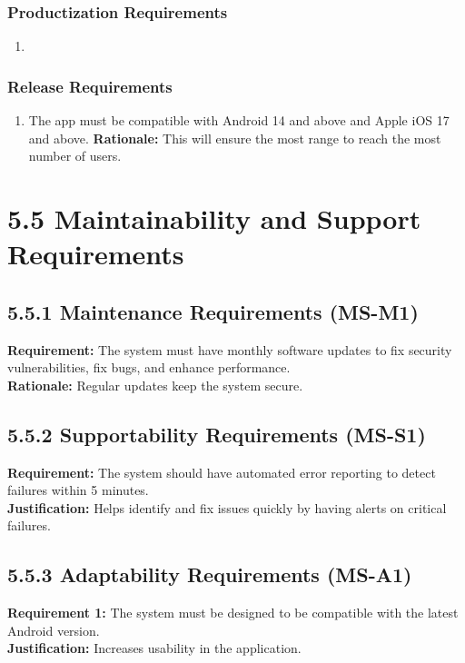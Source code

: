\documentclass[]{article}
\begin{document}
\subsubsection{Productization Requirements}
\label{ssub:productization_requirements}
\begin{enumerate}[{OE-P}1. ]
	\item 
\end{enumerate}

\subsubsection{Release Requirements}
\label{ssub:release_requirements}
\begin{enumerate}[{OE-R}1. ]
	\item The app must be compatible with Android 14 and above and Apple iOS 17 and above.
	 \textbf{ Rationale: } This will ensure the most range to reach the most number of users. 
\end{enumerate}


\section*{5.5 Maintainability and Support Requirements}

\subsection*{5.5.1 Maintenance Requirements (MS-M1)}
\textbf{Requirement:} The system must have monthly software updates to fix security vulnerabilities, fix bugs, and enhance performance.\\
\textbf{Rationale:} Regular updates keep the system secure.

\subsection*{5.5.2 Supportability Requirements (MS-S1)}
\textbf{Requirement:} The system should have automated error reporting to detect failures within 5 minutes.\\
\textbf{Justification:} Helps identify and fix issues quickly by having alerts on critical failures.

\subsection*{5.5.3 Adaptability Requirements (MS-A1)}
\textbf{Requirement 1:} The system must be designed to be compatible with the latest Android version.\\
\textbf{Justification:} Increases usability in the application.
\end{document}

